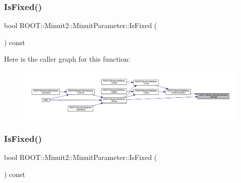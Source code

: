 \mbox{\label{classROOT_1_1Minuit2_1_1MinuitParameter_a2d7f48ed0d6d1ac124e390e54df4de32}} 
\subsubsection{\texorpdfstring{IsFixed()}{IsFixed()}\hspace{0.1cm}{\footnotesize\ttfamily [2/3]}}
{\footnotesize\ttfamily bool R\+O\+O\+T\+::\+Minuit2\+::\+Minuit\+Parameter\+::\+Is\+Fixed (\begin{DoxyParamCaption}{ }\end{DoxyParamCaption}) const\hspace{0.3cm}{\ttfamily [inline]}}

Here is the caller graph for this function\+:
\nopagebreak
\begin{figure}[H]
\begin{center}
\leavevmode
\includegraphics[width=350pt]{dd/dfb/classROOT_1_1Minuit2_1_1MinuitParameter_a2d7f48ed0d6d1ac124e390e54df4de32_icgraph}
\end{center}
\end{figure}
\mbox{\label{classROOT_1_1Minuit2_1_1MinuitParameter_a2d7f48ed0d6d1ac124e390e54df4de32}} 
\subsubsection{\texorpdfstring{IsFixed()}{IsFixed()}\hspace{0.1cm}{\footnotesize\ttfamily [3/3]}}
{\footnotesize\ttfamily bool R\+O\+O\+T\+::\+Minuit2\+::\+Minuit\+Parameter\+::\+Is\+Fixed (\begin{DoxyParamCaption}{ }\end{DoxyParamCaption}) const\hspace{0.3cm}{\ttfamily [inline]}}

